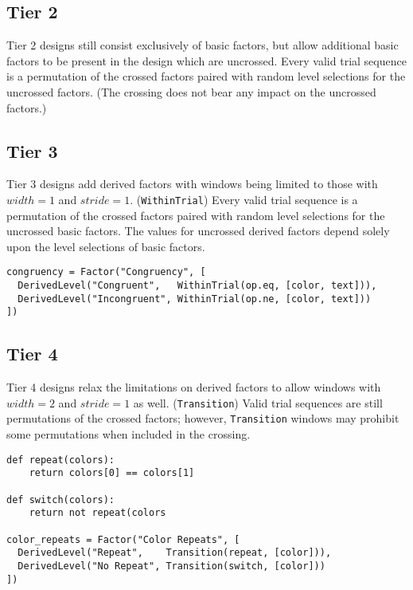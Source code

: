 \subsection{Tier 2}

Tier 2 designs still consist exclusively of basic factors, but allow additional basic factors to be present in the design which are uncrossed. Every valid trial sequence is a permutation of the crossed factors paired with random level selections for the uncrossed factors. (The crossing does not bear any impact on the uncrossed factors.)

\subsection{Tier 3}

Tier 3 designs add derived factors with windows being limited to those with $width=1$ and $stride=1$. (\texttt{WithinTrial}) Every valid trial sequence is a permutation of the crossed factors paired with random level selections for the uncrossed basic factors. The values for uncrossed derived factors depend solely upon the level selections of basic factors.

\begin{verbatim}
congruency = Factor("Congruency", [
  DerivedLevel("Congruent",   WithinTrial(op.eq, [color, text])),
  DerivedLevel("Incongruent", WithinTrial(op.ne, [color, text]))
])
\end{verbatim}

\subsection{Tier 4}

Tier 4 designs relax the limitations on derived factors to allow windows with $width=2$ and $stride=1$ as well. (\texttt{Transition}) Valid trial sequences are still permutations of the crossed factors; however, \texttt{Transition} windows may prohibit some permutations when included in the crossing.

\begin{verbatim}
def repeat(colors):
    return colors[0] == colors[1]

def switch(colors):
    return not repeat(colors

color_repeats = Factor("Color Repeats", [
  DerivedLevel("Repeat",    Transition(repeat, [color])),
  DerivedLevel("No Repeat", Transition(switch, [color]))
])
\end{verbatim}

